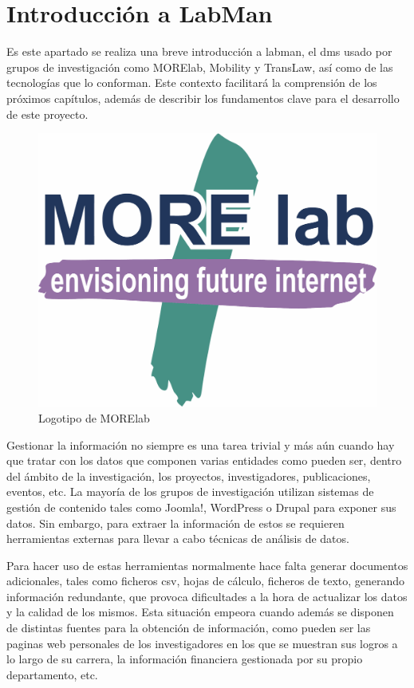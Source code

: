 \section{Introducción a LabMan}

Es este apartado se realiza una breve introducción a \acrfull{labman}, el \acrshort{dms} usado por grupos de investigación como MORElab, Mobility y TransLaw, así como de las tecnologías que lo conforman. Este contexto facilitará la comprensión de los próximos capítulos, además de describir los fundamentos clave para el desarrollo de este proyecto.

\begin{figure}[!htp]
	\centering
	\includegraphics[scale=0.15]{fig/MORElab-logo}
	\caption{Logotipo de MORElab}
\end{figure}

Gestionar la información no siempre es una tarea trivial y más aún cuando hay que tratar con los datos que componen varias entidades como pueden ser, dentro del ámbito de la investigación, los proyectos, investigadores, publicaciones, eventos, etc. La mayoría de los grupos de investigación utilizan sistemas de gestión de contenido tales como Joomla!\cite{joomla}, WordPress\cite{wordpress} o Drupal\cite{drupal} para exponer sus datos. Sin embargo, para extraer la información de estos  se requieren herramientas externas para llevar a cabo técnicas de análisis de datos. 

Para hacer uso de estas herramientas normalmente hace falta generar documentos adicionales, tales como ficheros \acrfull{csv}, hojas de cálculo, ficheros de texto, generando información redundante, que provoca dificultades a la hora de actualizar los datos y la calidad de los mismos. Esta situación empeora cuando además se disponen de distintas fuentes para la obtención de información, como pueden ser las paginas web personales de los investigadores en los que se muestran sus logros a lo largo de su carrera, la información financiera gestionada por su propio departamento, etc.

